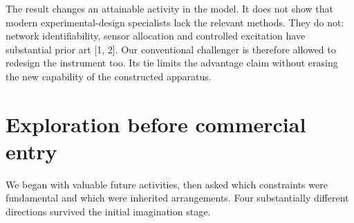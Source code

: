 \documentclass[
  11pt,
]{article}
\begin{document}
The result changes an attainable activity in the model. It does not show
that modern experimental-design specialists lack the relevant methods.
They do not: network identifiability, sensor allocation and controlled
excitation have substantial prior art {[}1, 2{]}. Our conventional
challenger is therefore allowed to redesign the instrument too. Its tie
limits the advantage claim without erasing the new capability of the
constructed apparatus.

\hypertarget{exploration-before-commercial-entry}{%
\section{Exploration before commercial
entry}\label{exploration-before-commercial-entry}}

We began with valuable future activities, then asked which constraints
were fundamental and which were inherited arrangements. Four
substantially different directions survived the initial imagination
stage.
\end{document}
